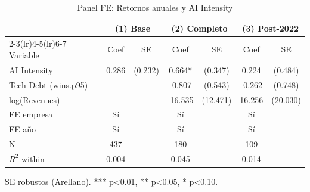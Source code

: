\begin{table}[h]
\centering
\caption{Panel FE: Retornos anuales y AI Intensity}
\label{tab:main_regression}
\begin{tabular}{lcccccc}
\toprule
 & \multicolumn{2}{c}{(1) Base} & \multicolumn{2}{c}{(2) Completo} & \multicolumn{2}{c}{(3) Post-2022} \\
\cmidrule(lr){2-3}\cmidrule(lr){4-5}\cmidrule(lr){6-7}
Variable & Coef & SE & Coef & SE & Coef & SE \\
\midrule
AI Intensity & 0.286 & (0.232) & 0.664* & (0.347) & 0.224 & (0.484) \\
Tech Debt (wins.p95) & — &  & -0.807 & (0.543) & -0.262 & (0.748) \\
log(Revenues) & — &  & -16.535 & (12.471) & 16.256 & (20.030) \\
\midrule
FE empresa & Sí & & Sí & & Sí & \\
FE año & Sí & & Sí & & Sí & \\
N & 437 & & 180 & & 109 & \\
$R^2$ within & 0.004 & & 0.045 & & 0.014 & \\
\bottomrule
\end{tabular}
\footnotesize{SE robustos (Arellano). *** p<0.01, ** p<0.05, * p<0.10.}
\end{table}